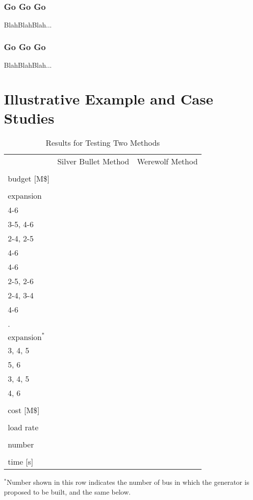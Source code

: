 \documentclass[journal]{IEEEtran}
\def\InvB{\makecell{Trans. Investment\\ budget [M\$]}}
\def\TotalCost{\makecell{Total\\ cost [M\$]}}
\def\IterNum{\makecell{Iteration\\ number}}
\def\WallTime{\makecell{Elapsed\\ time [s]}}
\def\TranExp{\makecell{Transmission\\ expansion}}
\def\GenExp{\makecell{Generation \\ $\text{expansion}^*$}}
\def\LoL{\makecell{Loss of\\ load rate}}
\def\one{\makecell{{1}}}
\def\two{\makecell{{2}}}
\def\three{\makecell{{3}}}
\def\TCo{\makecell{{1-5,} \\ {4-6}}}
\def\GCo{\makecell{{1, 2,} \\ {3, 4, 5}}}
\def\TcoC{\makecell{{99.16}}}
\def\TcoD{\makecell{{104.57}}}
\def\InoC{\makecell{{7}}}
\def\InoD{\makecell{{8}}}
\def\WtoC{\makecell{{9.2}}}
\def\WtoD{\makecell{{25.4}}}
\def\LoLoC{\makecell{{6.2\%}}}
\def\LoLoD{\makecell{{7.3\%}}}
\def\TCt{\makecell{{2-3, 2-5} \\ {3-5, 4-6}}}
\def\TDt{\makecell{{1-5, 2-4} \\ {2-5, 2-6}}}
\def\GCt{\makecell{{2, 4,} \\ {5, 6}}}
\def\GDt{\makecell{{1, 2,} \\ {4, 6}}}
\def\TctC{\makecell{{67.19}}}
\def\TctD{\makecell{{63.57}}}
\def\IntC{\makecell{{13}}}
\def\IntD{\makecell{{11}}}
\def\WttC{\makecell{{30.1}}}
\def\WttD{\makecell{{166.5}}}
\def\LoLtC{\makecell{{6.0\%}}}
\def\LoLtD{\makecell{{5.2\%}}}
\def\TCth{\makecell{{1-2, 2-3,} \\ {2-4, 2-5} \\ {4-6}}}
\def\TDth{\makecell{{1-5, 2-3,} \\ {2-4, 3-4} \\ {4-6}}}
\def\GCth{\makecell{{1, 2, 5}}}
\def\GDth{\makecell{{2, 4, 5}}}
\def\TcthC{\makecell{{56.51}}}
\def\TcthD{\makecell{{59.71}}}
\def\InthC{\makecell{{12}}}
\def\InthD{\makecell{{9}}}
\def\WtthC{\makecell{{27.3}}}
\def\WtthD{\makecell{{110.2}}}
\def\LoLthC{\makecell{{2.1\%}}}
\def\LoLthD{\makecell{{2.1\%}}}
\begin{document}
\subsubsection{Go Go Go}
BlahBlahBlah...
\subsubsection{Go Go Go}
BlahBlahBlah...



\section{Illustrative Example and Case Studies}

\begin{table}[H] 
\caption{Results for Testing Two Methods}
\centering
\setlength\tabcolsep{3.5pt}
  \begin{tabular}{lllllll}
    \toprule
    &
      \multicolumn{3}{c}{Silver Bullet Method} &
      \multicolumn{3}{c}{Werewolf Method} \\
 	\InvB & \one & \two & \three & \one & \two & \three\\ %
            \midrule
    \TranExp & \TCo & \TCt & \TCth & \TCo & \TDt & \TDth \\[0.22cm].  
    \GenExp & \GCo & \GCt & \GCth & \GCo & \GDt & \GDth \\[0.22cm]
    \TotalCost & \TcoC & \TctC & \TcthC & \TcoD & \TctD & \TcthD\\[0.22cm]
    \LoL & \LoLoC & \LoLtC & \LoLthC & \LoLoD & \LoLtD & \LoLthD \\[0.22cm] 
    \IterNum & \InoC & \IntC & \InthC & \InoD & \IntD & \InthD\\[0.22cm]
    \WallTime & \WtoC &\WttC &\WtthC & \WtoD &\WttD & \WtthD \\
    \bottomrule
  \end{tabular}
  \begin{tablenotes}
      \small
      \item $^*$Number shown in this row indicates the number of bus in which the generator is proposed to be built, and the same below.
    \end{tablenotes}
\end{table}
\end{document}
